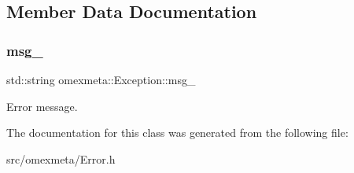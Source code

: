 \subsection{Member Data Documentation}
\mbox{\label{classomexmeta_1_1Exception_a99067aa4ed7e38cf27b986cca3734512}} 
\subsubsection{\texorpdfstring{msg\+\_\+}{msg\_}}
{\footnotesize\ttfamily std\+::string omexmeta\+::\+Exception\+::msg\+\_\+\hspace{0.3cm}{\ttfamily [protected]}}

Error message. 

The documentation for this class was generated from the following file\+:\begin{DoxyCompactItemize}
\item 
src/omexmeta/Error.\+h\end{DoxyCompactItemize}
